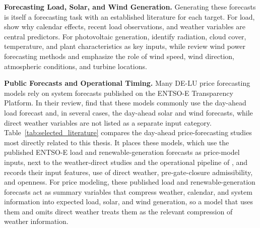 \noindent\textbf{Forecasting Load, Solar, and Wind Generation.}
Generating these forecasts is itself a forecasting task with an established
literature for each target. For load,
\textcite{hong2016probabilisticLoad} show why calendar effects, recent load
observations, and weather variables are central predictors. For photovoltaic
generation, \textcite{antonanzas2016pvForecasting} identify radiation, cloud
cover, temperature, and plant characteristics as key inputs, while
\textcite{foley2012windForecasting} review wind power forecasting methods and
emphasize the role of wind speed, wind direction, atmospheric conditions, and
turbine locations.

\noindent\textbf{Public Forecasts and Operational Timing.}
Many \mbox{DE-LU} price forecasting models rely on system forecasts published on the
\mbox{ENTSO-E} Transparency Platform. In their review,
\textcite{eiser2026operational} find that these models commonly use the
day-ahead load forecast and, in several cases, the day-ahead solar and wind
forecasts, while direct weather variables are not listed as a separate input
category. Table~\ref{tab:selected_literature} compares the day-ahead price-forecasting
studies most directly related to this thesis. It places these models, which use the published
\mbox{ENTSO-E} load and renewable-generation forecasts as price-model inputs,
next to the weather-direct studies and the operational
pipeline of \textcite{eiser2026operational}, and records their input features,
use of direct weather, pre-gate-closure admissibility, and openness. For price modeling, these published load and renewable-generation forecasts act
as summary variables that compress weather, calendar, and system information into
expected load, solar, and wind generation, so a model that uses them
and omits
direct weather treats them as the relevant compression of weather information.

